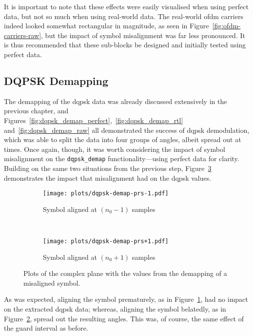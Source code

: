 \documentclass[class=report,11pt,crop=false]{standalone}
\begin{document}
It is important to note that these effects were easily visualised when using perfect data, but not so much when using real-world data. The real-world \gls{ofdm} carriers indeed looked somewhat rectangular in magnitude, as seen in Figure~\ref{fig:ofdm-carriers-raw}, but the impact of symbol misalignment was far less pronounced. It is thus recommended that these sub-blocks be designed and initially tested using perfect data.
  
\subsection{DQPSK Demapping}
The demapping of the \gls{dqpsk} data was already discussed extensively in the previous chapter, and Figures~\ref{fig:dqpsk_demap_perfect},~\ref{fig:dqpsk_demap_rtl} and~\ref{fig:dqpsk_demap_raw} all demonstrated the success of \gls{dqpsk} demodulation, which was able to split the data into four groups of angles, albeit spread out at times. Once again, though, it was worth considering the impact of symbol misalignment on the \texttt{dqpsk\_demap} functionality---using perfect data for clarity. Building on the same two situations from the previous step, Figure~\ref{fig:dqpsk-demap-prs} demonstrates the impact that misalignment had on the \gls{dqpsk} values.

\begin{figure}[htbp]
  \centering
  \captionsetup{type=figure}
  \begin{subfigure}[t]{0.45\textwidth}
    \centering
    \captionsetup{type=figure}
    \texttt{[image: plots/dqpsk-demap-prs-1.pdf]}
    \caption{Symbol aligned at \((n_0 - 1)\) samples}
    \label{fig:dqpsk-demap-prs-1}
  \end{subfigure}%
  ~ 
  \begin{subfigure}[t]{0.45\textwidth}
    \centering
    \captionsetup{type=figure}
    \texttt{[image: plots/dqpsk-demap-prs+1.pdf]}
    \caption{Symbol aligned at \((n_0 + 1)\) samples}
    \label{fig:dqpsk-demap-prs+1}
  \end{subfigure}
  \caption{Plots of the complex plane with the values from the  demapping of a misaligned  symbol.}
  \label{fig:dqpsk-demap-prs}
\end{figure}

As was expected, aligning the symbol prematurely, as in Figure~\ref{fig:dqpsk-demap-prs-1}, had no impact on the extracted \gls{dqpsk} data; whereas, aligning the symbol belatedly, as in Figure~\ref{fig:dqpsk-demap-prs+1}, spread out the resulting angles. This was, of course, the same effect of the guard interval as before.
\end{document}
